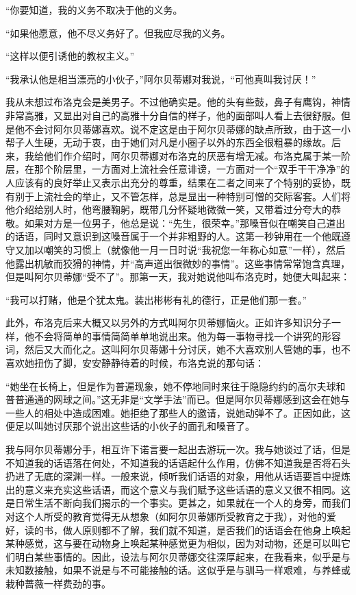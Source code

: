 \par “你要知道，我的义务不取决于他的义务。
\par “如果他愿意，他不尽义务好了。但我应尽我的义务。
\par “这样以便引诱他的教权主义。”
\par “我承认他是相当漂亮的小伙子，”阿尔贝蒂娜对我说，“可他真叫我讨厌！”
\par 我从未想过布洛克会是美男子。不过他确实是。他的头有些鼓，鼻子有鹰钩，神情非常高雅，又显出对自己的高雅十分自信的样子，他的面部叫人看上去很舒服。但是他不会讨阿尔贝蒂娜喜欢。说不定这是由于阿尔贝蒂娜的缺点所致，由于这一小帮子人生硬，无动于衷，由于她们对凡是小圈子以外的东西全很粗暴的缘故。后来，我给他们作介绍时，阿尔贝蒂娜对布洛克的厌恶有增无减。布洛克属于某一阶层，在那个阶层里，一方面对上流社会任意诽谤，一方面对一个“双手干干净净”的人应该有的良好举止又表示出充分的尊重，结果在二者之间来了个特别的妥协，既有别于上流社会的举止，又不管怎样，总是显出一种特别可憎的交际客套。人们将他介绍给别人时，他弯腰鞠躬，既带几分怀疑地微微一笑，又带着过分夸大的恭敬。如果对方是一位男子，他总是说：“先生，很荣幸。”那嗓音似在嘲笑自己道出的话语，同时又意识到这嗓音属于一个并非粗野的人。这第一秒钟用在一个他既遵守又加以嘲笑的习惯上（就像他一月一日时说“我祝您一年称心如意”一样），然后他露出机敏而狡猾的神情，并“高声道出很微妙的事情”。这些事情常常饱含真理，但是叫阿尔贝蒂娜“受不了”。那第一天，我对她说他叫布洛克时，她便大叫起来：
\par “我可以打赌，他是个犹太鬼。装出彬彬有礼的德行，正是他们那一套。”
\par 此外，布洛克后来大概又以另外的方式叫阿尔贝蒂娜恼火。正如许多知识分子一样，他不会将简单的事情简简单单地说出来。他为每一事物寻找一个讲究的形容词，然后又大而化之。这叫阿尔贝蒂娜十分讨厌，她不大喜欢别人管她的事，也不喜欢她扭伤了脚，安安静静待着的时候，布洛克说的那句话：
\par “她坐在长椅上，但是作为普遍现象，她不停地同时来往于隐隐约约的高尔夫球和普普通通的网球之间。”这无非是“文学手法”而已。但是阿尔贝蒂娜感到这会在她与一些人的相处中造成困难。她拒绝了那些人的邀请，说她动弹不了。正因如此，这便足以叫她讨厌那个说出这些话的小伙子的面孔和嗓音了。
\par 我与阿尔贝蒂娜分手，相互许下诺言要一起出去游玩一次。我与她谈过了话，但是不知道我的话语落在何处，不知道我的话语起什么作用，仿佛不知道我是否将石头扔进了无底的深渊一样。一般来说，倾听我们话语的对象，用他从话语要旨中提炼出的意义来充实这些话语，而这个意义与我们赋予这些话语的意义又很不相同。这是日常生活不断向我们揭示的一个事实。更甚之，如果就在一个人的身旁，而我们对这个人所受的教育觉得无从想象（如阿尔贝蒂娜所受教育之于我），对他的爱好，读的书，做人原则都不了解，我们就不知道，是否我们的话语会在他身上唤起某种感觉，这与要在动物身上唤起某种感觉更为相似，因为对动物，还是可以叫它们明白某些事情的。因此，设法与阿尔贝蒂娜交往深厚起来，在我看来，似乎是与未知数接触，如果不说是与不可能接触的话。这似乎是与驯马一样艰难，与养蜂或栽种蔷薇一样费劲的事。
